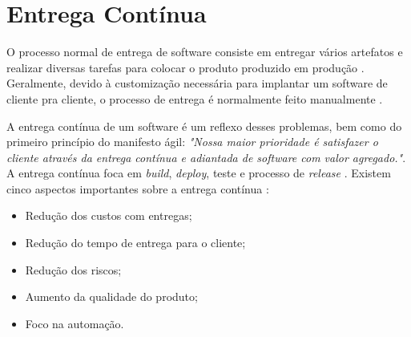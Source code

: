 \section{Entrega Contínua}

O processo normal de entrega de software consiste em entregar vários artefatos e realizar diversas tarefas para colocar o produto produzido em produção \cite{deploy1}. Geralmente, devido à customização necessária para implantar um software de cliente pra cliente, o processo de entrega é normalmente feito manualmente \cite{livro-deploy-continuo}.

A entrega contínua de um software é um reflexo desses problemas, bem como do primeiro princípio do manifesto ágil: \textit{"Nossa maior prioridade é satisfazer o cliente através da entrega contínua e adiantada de software com valor agregado."}\cite{manifesto}. A entrega contínua foca em \textit{build}, \textit{deploy}, teste e processo de \textit{release} \cite{livro-deploy-continuo}.
Existem cinco aspectos importantes sobre a entrega contínua \cite{network-world}:
\begin{itemize}
	\item Redução dos custos com entregas;
	\item Redução do tempo de entrega para o cliente;
	\item Redução dos riscos;
	\item Aumento da qualidade do produto;
	\item Foco na automação.
\end{itemize}

